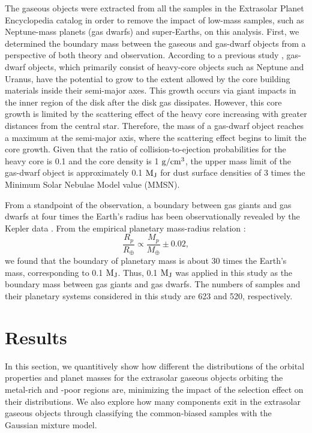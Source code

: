 \documentclass[twocolumn, dvipdfmx]{aastex62}
\begin{document}
\begin{CJK*}{UTF8}{min}
The gaseous objects were extracted from all the samples in the Extrasolar Planet Encyclopedia catalog in order to remove the impact of low-mass samples, such as Neptune-mass planets (gas dwarfs) and super-Earths, on this analysis. First, we determined the boundary mass between the gaseous and gas-dwarf objects from a perspective of both theory and observation. According to a previous study \citep{2004ApJ...604..388I}, gas-dwarf objects, which primarily consist of heavy-core objects such as Neptune and Uranus, have the potential to grow to the extent allowed by the core building materials inside their semi-major axes. This growth occurs via giant impacts in the inner region of the disk after the disk gas dissipates. However, this core growth is limited by the scattering effect of the heavy core increasing with greater distances from the central star. Therefore, the mass of a gas-dwarf object reaches a maximum at the semi-major axis, where the scattering effect begins to limit the core growth. Given that the ratio of collision-to-ejection probabilities for the heavy core is 0.1 and the core density is 1 $\rm g/cm^3$, the upper mass limit of the gas-dwarf object is approximately 0.1 $\rm M_J$ for dust surface densities of 3 times the Minimum Solar Nebulae Model value (MMSN).

From a standpoint of the observation, a boundary between gas giants and gas dwarfs at four times the Earth's radius has been observationally revealed by the Kepler data \citep{2012Natur.486..375B}. From the empirical planetary mass-radius relation \citep[e.g.,][]{2017A&A...604A..83B}:
\begin{equation}
\frac{R_p}{R_\oplus} \propto \frac{M_p}{M_\oplus}\pm0.02 ,
\end{equation}
we found that the boundary of planetary mass is about 30 times the Earth's mass, corresponding to 0.1 $\rm M_J$. Thus, 0.1 $\rm M_J$ was applied in this study as the boundary mass between gas giants and gas dwarfs. The numbers of samples and their planetary systems considered in this study are 623 and 520, respectively.


\section{Results} \label{sec:results}

In this section, we quantitively show how different the distributions of the orbital properties and planet masses for the extrasolar gaseous objects orbiting the metal-rich and -poor regions are, minimizing the impact of the selection effect on their distributions. We also explore how many components exit in the extrasolar gaseous objects through classifying the common-biased samples with the Gaussian mixture model.



\end{CJK*}
\end{document}
